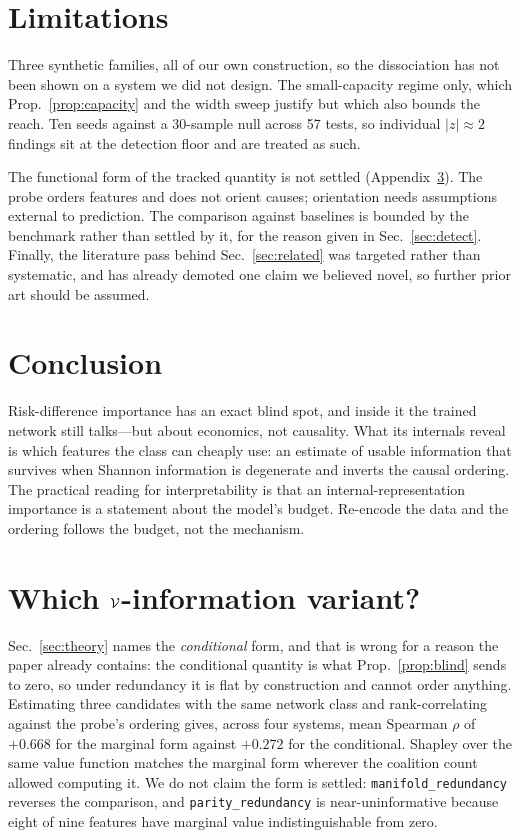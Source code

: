 \section{Limitations}\label{sec:limits}

Three synthetic families, all of our own construction, so the dissociation has
not been shown on a system we did not design. The small-capacity regime only,
which Prop.~\ref{prop:capacity} and the width sweep justify but which also
bounds the reach. Ten seeds against a 30-sample null across 57 tests, so
individual $|z|\approx2$ findings sit at the detection floor and are treated as
such.

The functional form of the tracked quantity is not settled
(Appendix~\ref{app:variant}). The probe orders features and does not orient
causes; orientation needs assumptions external to prediction. The comparison
against baselines is bounded by the benchmark rather than settled by it, for the
reason given in Sec.~\ref{sec:detect}. Finally, the literature pass behind
Sec.~\ref{sec:related} was targeted rather than systematic, and has already
demoted one claim we believed novel, so further prior art should be assumed.

\section{Conclusion}

Risk-difference importance has an exact blind spot, and inside it the trained
network still talks---but about economics, not causality. What its internals
reveal is which features the class can cheaply use: an estimate of usable
information that survives when Shannon information is degenerate and inverts the
causal ordering. The practical reading for interpretability is that an
internal-representation importance is a statement about the model's budget.
Re-encode the data and the ordering follows the budget, not the mechanism.

\appendix

\section{Which $\mathcal{V}$-information variant?}\label{app:variant}

Sec.~\ref{sec:theory} names the \emph{conditional} form, and that is wrong for a
reason the paper already contains: the conditional quantity is what
Prop.~\ref{prop:blind} sends to zero, so under redundancy it is flat by
construction and cannot order anything. Estimating three candidates with the same
network class and rank-correlating against the probe's ordering gives, across
four systems, mean Spearman $\rho$ of $+0.668$ for the marginal form against
$+0.272$ for the conditional. Shapley over the same value function matches the
marginal form wherever the coalition count allowed computing it. We do not claim
the form is settled: \texttt{manifold\_redundancy} reverses the comparison, and
\texttt{parity\_redundancy} is near-uninformative because eight of nine features
have marginal value indistinguishable from zero.

